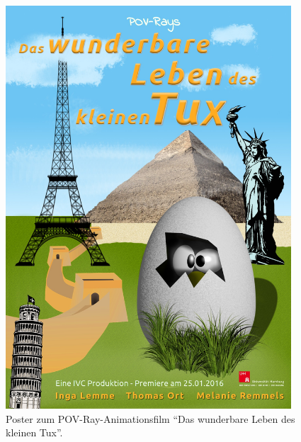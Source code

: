 \documentclass[11pt,parskip]{scrartcl}
\begin{document}
\newpage


\begin{figure}[htbp]
  \centering
  \includegraphics[width=0.95\textwidth]{./fig/poster.jpg}
  \caption{
    Poster zum POV-Ray-Animationsfilm \enquote{Das wunderbare Leben des kleinen
      Tux}.
  }
  \label{fig:poster}
\end{figure}


\newpage




\end{document}
